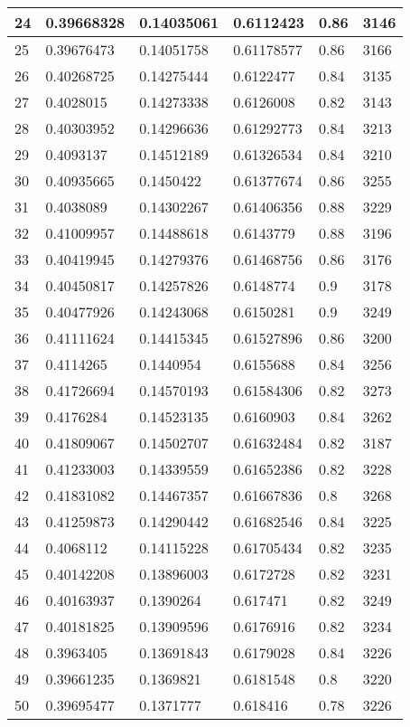 \begin{longtable}{|l|l|l|l|l|l|}
24 & 0.39668328 & 0.14035061 & 0.6112423 & 0.86 & 3146 \\ \hline 
25 & 0.39676473 & 0.14051758 & 0.61178577 & 0.86 & 3166 \\ \hline 
26 & 0.40268725 & 0.14275444 & 0.6122477 & 0.84 & 3135 \\ \hline 
27 & 0.4028015 & 0.14273338 & 0.6126008 & 0.82 & 3143 \\ \hline 
28 & 0.40303952 & 0.14296636 & 0.61292773 & 0.84 & 3213 \\ \hline 
29 & 0.4093137 & 0.14512189 & 0.61326534 & 0.84 & 3210 \\ \hline 
30 & 0.40935665 & 0.1450422 & 0.61377674 & 0.86 & 3255 \\ \hline 
31 & 0.4038089 & 0.14302267 & 0.61406356 & 0.88 & 3229 \\ \hline 
32 & 0.41009957 & 0.14488618 & 0.6143779 & 0.88 & 3196 \\ \hline 
33 & 0.40419945 & 0.14279376 & 0.61468756 & 0.86 & 3176 \\ \hline 
34 & 0.40450817 & 0.14257826 & 0.6148774 & 0.9 & 3178 \\ \hline 
35 & 0.40477926 & 0.14243068 & 0.6150281 & 0.9 & 3249 \\ \hline 
36 & 0.41111624 & 0.14415345 & 0.61527896 & 0.86 & 3200 \\ \hline 
37 & 0.4114265 & 0.1440954 & 0.6155688 & 0.84 & 3256 \\ \hline 
38 & 0.41726694 & 0.14570193 & 0.61584306 & 0.82 & 3273 \\ \hline 
39 & 0.4176284 & 0.14523135 & 0.6160903 & 0.84 & 3262 \\ \hline 
40 & 0.41809067 & 0.14502707 & 0.61632484 & 0.82 & 3187 \\ \hline 
41 & 0.41233003 & 0.14339559 & 0.61652386 & 0.82 & 3228 \\ \hline 
42 & 0.41831082 & 0.14467357 & 0.61667836 & 0.8 & 3268 \\ \hline 
43 & 0.41259873 & 0.14290442 & 0.61682546 & 0.84 & 3225 \\ \hline 
44 & 0.4068112 & 0.14115228 & 0.61705434 & 0.82 & 3235 \\ \hline 
45 & 0.40142208 & 0.13896003 & 0.6172728 & 0.82 & 3231 \\ \hline 
46 & 0.40163937 & 0.1390264 & 0.617471 & 0.82 & 3249 \\ \hline 
47 & 0.40181825 & 0.13909596 & 0.6176916 & 0.82 & 3234 \\ \hline 
48 & 0.3963405 & 0.13691843 & 0.6179028 & 0.84 & 3226 \\ \hline 
49 & 0.39661235 & 0.1369821 & 0.6181548 & 0.8 & 3220 \\ \hline 
50 & 0.39695477 & 0.1371777 & 0.618416 & 0.78 & 3226 \\ \hline 
\end{longtable}